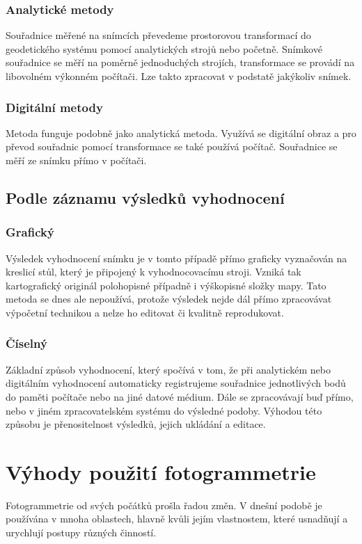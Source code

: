 \documentclass[12pt]{report}			%
\begin{document}
                \subsection{Analytické metody}
                Souřadnice měřené na snímcích převedeme prostorovou transformací do geodetického systému pomocí analytických strojů nebo početně. Snímkové souřadnice se měří na poměrně jednoduchých strojích, transformace se provádí na libovolném výkonném počítači. Lze takto zpracovat v podstatě jakýkoliv snímek.
                \subsection{Digitální metody}
                Metoda funguje podobně jako analytická metoda. Využívá se digitální obraz a pro převod souřadnic pomocí transformace se také používá počítač. Souřadnice se měří ze snímku přímo v počítači.
            \section{Podle záznamu výsledků vyhodnocení}
                \subsection{Grafický}
                Výsledek vyhodnocení snímku je v tomto případě přímo graficky vyznačován na kreslicí stůl, který je připojený k vyhodnocovacímu stroji. Vzniká tak kartografický originál polohopisné případně i výškopisné složky mapy. Tato metoda se dnes ale nepoužívá, protože výsledek nejde dál přímo zpracovávat výpočetní technikou a nelze ho editovat či kvalitně reprodukovat.
                \subsection{Číselný}
                Základní způsob vyhodnocení, který spočívá v tom, že při analytickém nebo digitálním vyhodnocení automaticky registrujeme souřadnice jednotlivých bodů do paměti počítače nebo na jiné datové médium. Dále se zpracovávají buď přímo, nebo v jiném zpracovatelském systému do výsledné podoby. Výhodou této způsobu je přenositelnost výsledků, jejich ukládání a editace.
        \chapter{Výhody použití fotogrammetrie}
        Fotogrammetrie od svých počátků prošla řadou změn. V dnešní podobě je používána v mnoha oblastech, hlavně kvůli jejím vlastnostem, které usnadňují a urychlují postupy různých činností.
\end{document}
